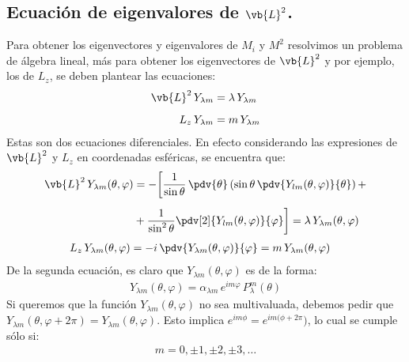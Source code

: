 \subsection{Ecuación de eigenvalores de \texorpdfstring{$\vb{L}^{2}$.}{L2}}

Para obtener los eigenvectores y eigenvalores de $M_{i}$ y $M^{2}$ resolvimos un problema de álgebra lineal, más para obtener los eigenvectores de $\vb{L}^{2}$ y por ejemplo, los de $L_{z}$, se deben plantear las ecuaciones:
\begin{align}
\begin{aligned}[b]
\vb{L}^{2} \, Y_{\lambda m} &= \lambda \, Y_{\lambda m} \\[0.5em]
L_{z} \, Y_{\lambda m} &= m \, Y_{\lambda m}
\end{aligned}
\label{eq:ecuacion_10_110}
\end{align}
Estas son dos ecuaciones diferenciales. En efecto considerando las expresiones de $\vb{L}^{2}$ y $L_{z}$ en coordenadas esféricas, se encuentra que:
\begin{align}
\begin{aligned}[b]
\vb{L}^{2} \, Y_{\lambda m} (\theta, \varphi) &= - \bigg[ \dfrac{1}{\sin \theta} \, \pdv{\theta} \left( \sin \theta \, \pdv{Y_{lm} (\theta, \varphi)}{\theta} \right) + \\[0.5em]
&+ \dfrac{1}{\sin^{2} \theta} \pdv[2]{Y_{lm} (\theta, \varphi)}{\varphi}  \bigg] = \lambda \, Y_{\lambda m} (\theta, \varphi)
\end{aligned}
\label{eq:ecuacion_10_111}
\end{align}
\begin{align}
L_{z} \, Y_{\lambda m} (\theta, \varphi) &= - i \, \pdv{Y_{\lambda m} (\theta, \varphi)}{\varphi} = m \, Y_{\lambda m} (\theta, \varphi) \label{eq:ecuacion_10_112}
\end{align}
De la segunda ecuación, es claro que $Y_{\lambda m} (\theta, \varphi)$ es de la forma:
\begin{align}
Y_{\lambda m} (\theta, \varphi) = \alpha_{\lambda m} \, e^{i m \varphi} \, P_{\lambda}^{m} (\theta)
\label{eq:ecuacion_10_113}
\end{align}
Si queremos que la función $Y_{\lambda m} (\theta, \varphi) $ no sea multivaluada, debemos pedir que $Y_{\lambda m} (\theta, \varphi + 2 \pi) = Y_{\lambda m} (\theta, \varphi)$. Esto implica $e^{i m \phi} = e^{i m (\phi + 2\pi})$, lo cual se cumple sólo si:
\begin{align}
m = 0, \pm 1, \pm 2, \pm 3, \ldots
\label{eq:ecuacion_10_114}
\end{align}

